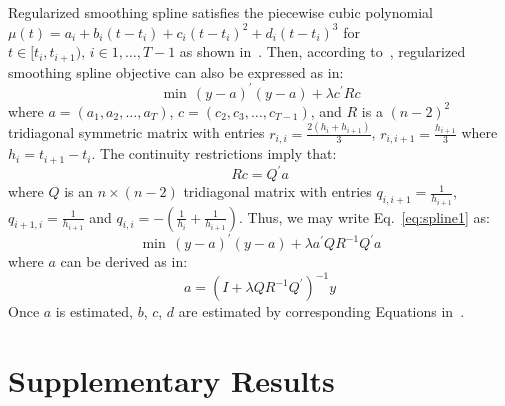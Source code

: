 \documentclass[10pt]{article}
\newcommand{\TPS}{\textit{TPS}\xspace}
\begin{document}
Regularized smoothing spline satisfies the piecewise cubic polynomial $\mu(t) = a_{i} + b_{i}(t-t_{i}) + c_{i}(t-t_{i})^{2} + d_{i}(t-t_{i})^{3}$ for $t \in [t_{i}, t_{i+1}),\, i \in 1, \ldots, T-1$ as shown in~\cite{wahba1990}. Then, according to~\cite{reinsch1967,deboor}, regularized smoothing spline objective can also be expressed as in:
%
\begin{equation}\label{eq:spline1}
\min\,(y-a)^{'}(y-a) + \lambda c^{'} R c
\end{equation}
%
where $a=(a_{1}, a_{2}, \ldots, a_{T})$, $c=(c_{2}, c_{3}, \ldots, c_{T-1})$, and $R$ is a $(n-2)^{2}$ tridiagonal symmetric matrix with entries $r_{i,i} = \frac{2(h_{i}+h_{i+1})}{3}$, $r_{i,i+1} = \frac{h_{i+1}}{3}$ where $h_{i} = t_{i+1} - t_{i}$. The continuity restrictions imply that:
%
\begin{equation}\label{eq:spline2}
R c= Q^{'}a
\end{equation}
%
where $Q$ is an $n \times (n-2)$ tridiagonal matrix with entries $q_{i,i+1} = \frac{1}{h_{i+1}}$, $q_{i+1,i} = \frac{1}{h_{i+1}}$ and  $q_{i,i} = - (\frac{1}{h_{i}} + \frac{1}{h_{i+1}})$. Thus, we may write Eq.~\ref{eq:spline1} as:
%
\begin{equation}
\min\,(y-a)^{'}(y-a) + \lambda a^{'} Q R^{-1} Q^{'} a
\end{equation}
%
where $a$ can be derived as in:
%
\begin{equation}
a = (I +  \lambda Q R^{-1} Q^{'})^{-1} y
\end{equation}
%
Once $a$ is estimated, $b$, $c$, $d$ are estimated by corresponding Equations in~\cite{reinsch1967}.


\section{Supplementary Results}

\end{document}
